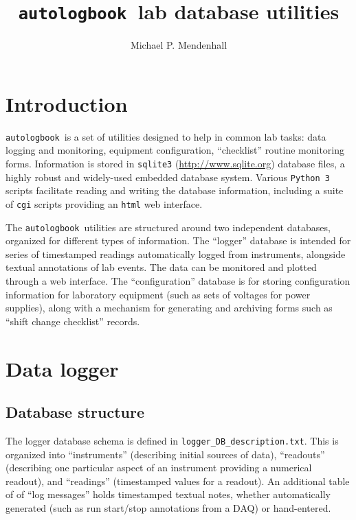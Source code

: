 \documentclass[12pt,english]{article}
\newcommand{\cd}[1]{\texttt{#1}}
\newcommand{\alb}{\cd{autologbook}}
\begin{document}
\title{\alb\ lab database utilities}
\author{Michael P. Mendenhall}
\maketitle
\tableofcontents

\section{Introduction}

\alb\ is a set of utilities designed to help in common lab tasks:
	data logging and monitoring, equipment configuration, ``checklist'' routine monitoring forms.
Information is stored in \cd{sqlite3} (\url{http://www.sqlite.org}) database files,
	a highly robust and widely-used embedded database system.
Various \cd{Python 3} scripts facilitate reading and writing the database information,
	including a suite of \cd{cgi} scripts providing an \cd{html} web interface.

The \alb\ utilities are structured around two independent databases,
	organized for different types of information.
The ``logger'' database is intended for series of timestamped readings automatically logged
	from instruments, alongside textual annotations of lab events.
The data can be monitored and plotted through a web interface.
The ``configuration'' database is for storing configuration information for
	laboratory equipment (such as sets of voltages for power supplies),
	along with a mechanism for generating and archiving forms such as ``shift change checklist'' records.

%
%
%
\section{Data logger}

%
%
\subsection{Database structure}
The logger database schema is defined in \cd{logger\_DB\_description.txt}.
This is organized into ``instruments'' (describing initial sources of data),
	``readouts'' (describing one particular aspect of an instrument providing a numerical readout),
	and ``readings'' (timestamped values for a readout).
An additional table of of ``log messages'' holds timestamped textual notes,
	whether automatically generated (such as run start/stop annotations from a DAQ) or hand-entered.

%
%
\end{document}
